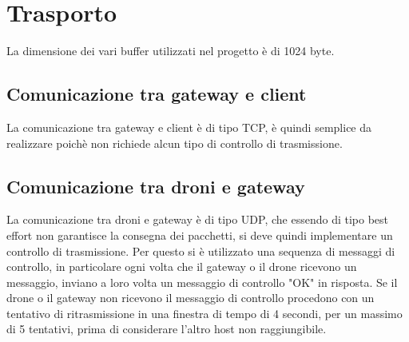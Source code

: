 \documentclass[a4paper,12pt]{report}
\begin{document}
\chapter{Trasporto}

La dimensione dei vari buffer utilizzati nel progetto è di 1024 byte. 
\section{Comunicazione tra gateway e client}
La comunicazione tra gateway e client è di tipo TCP, è quindi semplice da realizzare poichè non richiede alcun tipo di controllo di trasmissione.
\section{Comunicazione tra droni e gateway}
La comunicazione tra droni e gateway è di tipo UDP, che essendo di tipo best effort non garantisce la consegna dei pacchetti, si deve quindi implementare un controllo 
di trasmissione. Per questo si è utilizzato una sequenza di messaggi di controllo, in particolare ogni volta che il gateway o il drone ricevono un messaggio, inviano a 
loro volta un messaggio di controllo "OK" in risposta. Se il drone o il gateway non ricevono il messaggio di controllo procedono con un tentativo di ritrasmissione in una
finestra di tempo di 4 secondi, per un massimo di 5 tentativi, prima di considerare l'altro host non raggiungibile.

\begin{figure}[p]
 \end{figure}
\end{document}
